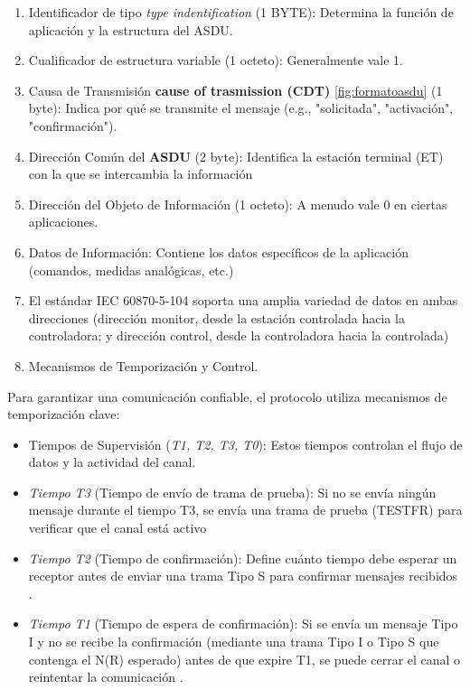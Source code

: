 \documentclass[a5paper]{book}%
\begin{document}
\begin{enumerate}
\item Identificador de tipo \textit{type indentification} (1 BYTE): Determina la función de aplicación y la estructura del ASDU.
\item Cualificador de estructura variable (1 octeto): Generalmente vale 1.
\item Causa de Transmisión \textbf{cause of trasmission (CDT)} \ref{fig:formatoasdu} (1 byte): Indica por qué se transmite el mensaje (e.g., "solicitada", "activación", "confirmación").
\item Dirección Común del \textbf{ASDU} (2 byte): Identifica la estación terminal (ET) con la que se intercambia la información
\item Dirección del Objeto de Información (1 octeto): A menudo vale 0 en ciertas aplicaciones.
\item Datos de Información: Contiene los datos específicos de la aplicación (comandos, medidas analógicas, etc.)
\item El estándar IEC 60870-5-104 soporta una amplia variedad de datos en ambas direcciones (dirección monitor, desde la estación controlada hacia la controladora; y dirección control, desde la controladora hacia la controlada)
\item Mecanismos de Temporización y Control.

\end{enumerate}

Para garantizar una comunicación confiable, el protocolo utiliza mecanismos de temporización clave:

\begin{itemize}
\item Tiempos de Supervisión (\textit{T1, T2, T3, T0}): Estos tiempos controlan el flujo de datos y la actividad del canal.
\item \textit{Tiempo T3} (Tiempo de envío de trama de prueba): Si no se envía ningún mensaje durante el tiempo T3, se envía una trama de prueba (TESTFR) para verificar que el canal está activo
\item\textit{ Tiempo T2} (Tiempo de confirmación): Define cuánto tiempo debe esperar un receptor antes de enviar una trama Tipo S para confirmar mensajes recibidos
.
\item \textit{Tiempo T1} (Tiempo de espera de confirmación): Si se envía un mensaje Tipo I y no se recibe la confirmación (mediante una trama Tipo I o Tipo S que contenga el N(R) esperado) antes de que expire T1, se puede cerrar el canal o reintentar la comunicación
.
\end{itemize}
\end{document}
